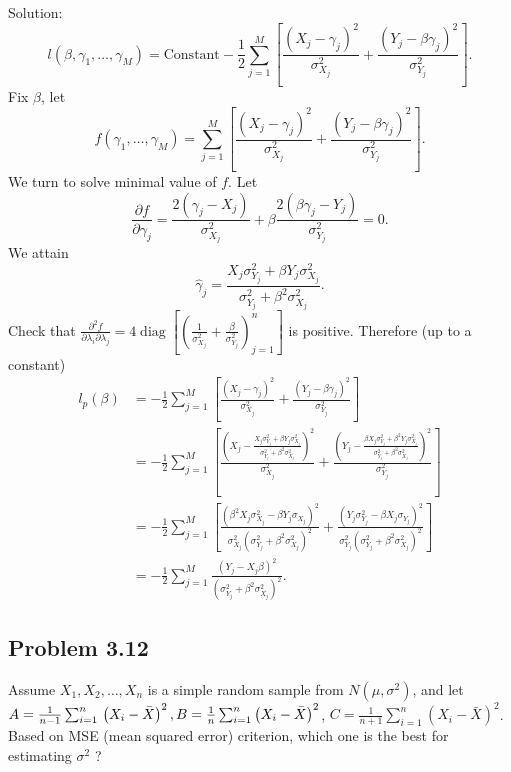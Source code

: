 {Solution:}
\[
l(\beta,\gamma_{1},\ldots,\gamma_{M})=\text{Constant}-\frac{1}{2}\sum_{j=1}^{M}\left[\frac{(X_{j}-\gamma_{j})^{2}}{\sigma_{X_{j}}^{2}}+\frac{(Y_{j}-\beta\gamma_{j})^{2}}{\sigma_{Y_{j}}^{2}}\right].
\]
Fix $\beta$, let
\[f(\gamma_{1},\ldots,\gamma_{M})=\sum_{j=1}^{M}\left[\frac{(X_{j}-\gamma_{j})^{2}}{\sigma_{X_{j}}^{2}}+\frac{(Y_{j}-\beta\gamma_{j})^{2}}{\sigma_{Y_{j}}^{2}}\right].\]
We turn to solve minimal value of $f$. Let
\[
\frac{\partial f}{\partial\gamma_{j}}=\frac{2(\gamma_{j}-X_{j})}{\sigma_{X_{j}}^{2}}+\beta\frac{2(\beta\gamma_{j}-Y_{j})}{\sigma_{Y_{j}}^{2}}=0.
\]
We attain
\[
\hat{\gamma}_{j}=\frac{X_{j}\sigma_{Y_{j}}^{2}+\beta Y_{j}\sigma_{X_{j}}^{2}}{\sigma_{Y_{j}}^{2}+\beta^{2}\sigma_{X_{j}}^{2}}.
\]
Check that $\frac{\partial^{2}f}{\partial\lambda_{i}\partial\lambda_{j}}=4\operatorname{diag}\left[\left(\frac{1}{\sigma_{X_{j}}^{2}}+\frac{\beta}{\sigma_{Y_{j}}^{2}}\right)_{j=1}^{n}\right]$ is positive. Therefore (up to a constant)
\[
\begin{aligned}
l_{p}(\beta)&=-\frac{1}{2}\sum_{j=1}^{M}\left[\frac{\left(X_{j}-\gamma_{j}\right)^{2}}{\sigma_{X_{j}}^{2}}+\frac{\left(Y_{j}-\beta\gamma_{j}\right)^{2}}{\sigma_{Y_{j}}^{2}}\right] \\
&=-\frac{1}{2}\sum_{j=1}^{M}\left[\frac{\left(X_{j}-\frac{X_{j}\sigma_{Y_{j}}^{2}+\beta Y_{j}\sigma_{X_{j}}^{2}}{\sigma_{Y_{j}}^{2}+\beta^{2}\sigma_{X_{j}}^{2}}\right)^{2}}{\sigma_{X_{j}}^{2}}+\frac{\left(Y_{j}-\frac{\beta X_{j}\sigma_{Y_{j}}^{2}+\beta^{2}Y_{j}\sigma_{X_{j}}^{2}}{\sigma_{Y_{j}}^{2}+\beta^{2}\sigma_{X_{j}}^{2}}\right)^{2}}{\sigma_{Y_{j}}^{2}}\right] \\
&=-\frac{1}{2}\sum_{j=1}^{M}\left[\frac{\left(\beta^{2}X_{j}\sigma_{X_{j}}^{2}-\beta Y_{j}\sigma_{X_{j}}\right)^{2}}{\sigma_{X_{j}}^{2}\left(\sigma_{Y_{j}}^{2}+\beta^{2}\sigma_{X_{j}}^{2}\right)^{2}}+\frac{\left(Y_{j}\sigma_{Y_{j}}^{2}-\beta X_{j}\sigma_{Y_{j}}\right)^{2}}{\sigma_{Y_{j}}^{2}\left(\sigma_{Y_{j}}^{2}+\beta^{2}\sigma_{X_{j}}^{2}\right)^{2}}\right] \\
&=-\frac{1}{2}\sum_{j=1}^{M}\frac{\left(Y_{j}-X_{j}\beta\right)^{2}}{\left(\sigma_{Y_{j}}^{2}+\beta^{2}\sigma_{X_{j}}^{2}\right)^{2}}.
\end{aligned}
\]

\subsection*{Problem 3.12}
Assume $X_{1},X_{2},\ldots,X_{n}$ is a simple random sample from $N\left(\mu,\sigma^{2}\right)$, and let $A=\frac{1}{n-1}\sum_{i=1}^{n}\\
\left(X_{i}-\bar{X}\right)^{2},B=\frac{1}{n}\sum_{i=1}^{n}\left(X_{i}-\bar{X}\right)^{2}$, $C=\frac{1}{n+1}\sum_{i=1}^{n}\left(X_{i}-\bar{X}\right)^{2}$. Based on MSE (mean squared error) criterion, which one is the best for estimating $\sigma^{2}$ ?


